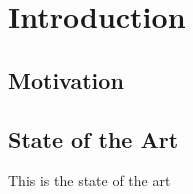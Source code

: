 \chapter{Introduction}
\label{chap:\currfilebase}

\section{Motivation}
\label{sec:motivation}

\section{State of the Art}
\label{sec:state_of_art}
This is the state of the art




